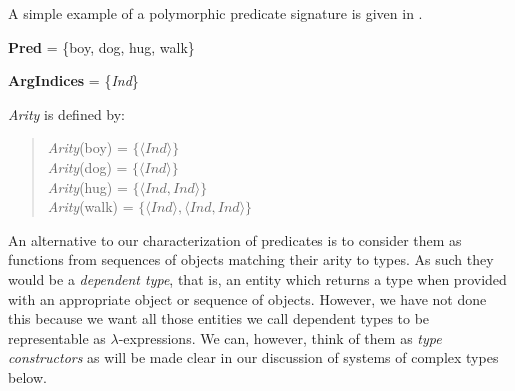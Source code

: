 A simple example of a polymorphic predicate signature is given in
\nexteg{}.
\begin{ex} 
\begin{subex} 
 
\item \textbf{Pred} = \{boy, dog, hug, walk\} 
 
\item \textbf{ArgIndices} = \{\textit{Ind}\}

\item \textit{Arity} is defined by:
\begin{quote}
\textit{Arity}(boy) = $\{\langle\textit{Ind}\rangle\}$\\
\textit{Arity}(dog) = $\{\langle\textit{Ind}\rangle\}$\\
\textit{Arity}(hug) = $\{\langle\textit{Ind}, \textit{Ind}\rangle\}$\\
\textit{Arity}(walk) = $\{\langle\textit{Ind}\rangle, \langle\textit{Ind}, \textit{Ind}\rangle\}$
\end{quote} 
 
\end{subex} 
   
\end{ex}   

An alternative to our characterization of predicates is to consider them as functions from sequences of objects
matching their arity to types.  As such they would be a
\textit{dependent type}, that is, an entity which returns a type when
provided with an appropriate object or sequence of objects.  However,
we have not done this because we want all those entities we call
dependent types to be representable as $\lambda$-expressions.  We can,
however, think of them as \textit{type constructors} as will be made
clear in our discussion of systems of complex types below.

